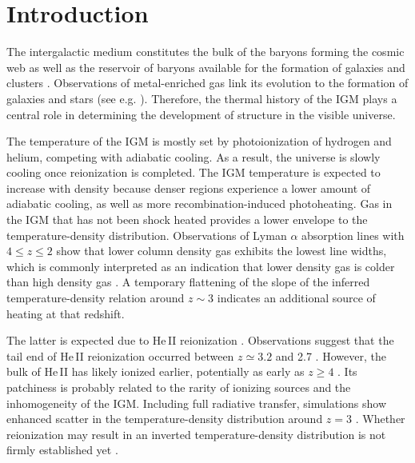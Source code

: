 \documentclass[numberedappendix]{emulateapj}
\begin{document}
\section{Introduction}
The intergalactic medium constitutes the bulk of the baryons forming the cosmic web \citep{1996Natur.380..603B} as well as the reservoir of baryons available for the formation of galaxies and clusters \citep{1997ApJ...489....7R}. Observations of metal-enriched gas link its evolution to the formation of galaxies and stars (see e.g. \citet{2009A&A...493..409S,2010MNRAS.407.2063W}). Therefore, the thermal history of the IGM plays a central role in determining the development of structure in the visible universe.

The temperature of the IGM is mostly set by photoionization of hydrogen and helium, competing with adiabatic cooling. As a result, the universe is slowly cooling once reionization is completed. The IGM temperature is expected to increase with density because denser regions experience a lower amount of adiabatic cooling, as well as more recombination-induced photoheating. Gas in the IGM that has not been shock heated provides a lower envelope to the temperature-density distribution.  Observations of Lyman $\alpha$ absorption lines with $4\leqslant z \leqslant 2$ show that lower column density gas exhibits the lowest line widths, which is commonly interpreted as an indication that lower density gas is colder than high density gas \citep{1997ApJ...484..672K,2000MNRAS.318..817S,2000ApJ...534...41R,2012ApJ...757L..30R}. A temporary flattening of the slope of the inferred temperature-density relation around $z\sim 3$ indicates an additional source of heating at that redshift.

The latter is expected due to He\,\textsc{II} reionization \citep[e.g.][]{2007MNRAS.380.1369T,2009ApJ...694..842M,2013MNRAS.435.3169C,2014arXiv1410.1531P}. Observations suggest that the tail end of He\,\textsc{II} reionization occurred between $z \simeq 3.2$ and 2.7 \citep{2001Sci...293.1112K,2014ApJ...784...42S}. However, the bulk of He\,\textsc{II} has likely ionized earlier, potentially as early as $z\ge 4$ \citep{2014arXiv1405.7405W}.  Its patchiness is probably related to the rarity of ionizing sources and the inhomogeneity of the IGM.  Including full radiative transfer, simulations show enhanced scatter in the temperature-density distribution around $z=3$ \citep{2009ApJ...694..842M}. Whether reionization may result in an inverted temperature-density distribution \citep{2012MNRAS.423....7M} is not firmly established yet \citep{2013MNRAS.435.3169C}. 
\end{document}
